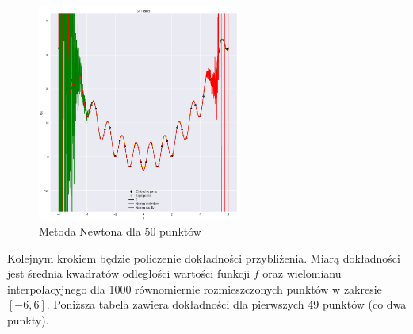 \documentclass{article}
\begin{document}
\begin{figure}[H]
    \centering
    \includegraphics[width=0.6\textwidth]{img/newt_50.png}
    \caption{Metoda Newtona dla 50 punktów}
\end{figure}

Kolejnym krokiem będzie policzenie dokładności przybliżenia. Miarą dokładności jest średnia kwadratów odległości wartości 
funkcji $f$ oraz wielomianu interpolacyjnego dla 1000 równomiernie rozmieszczonych punktów w zakresie $[-6,6]$. Poniższa tabela
zawiera dokładności dla pierwszych 49 punktów (co dwa punkty).
\end{document}
